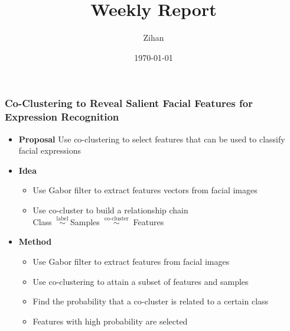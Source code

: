 \documentclass[11pt]{beamer}
\title{Weekly Report}
\author{Zihan}
\date{\today}
\begin{document}


\begin{frame}
    \frametitle{Co-Clustering to Reveal Salient Facial Features for Expression Recognition}
    \begin{itemize}
        \item \textbf{Proposal} Use co-clustering to select features that can be used to classify facial expressions
        \item \textbf{Idea}
              \begin{itemize}
                  \item Use Gabor filter to extract features vectors from facial images
                  \item Use co-cluster to build a relationship chain \\
                        Class $\stackrel{\text { label }}{\sim }$Samples $\stackrel{\text { co-cluster }}{\sim }$ Features
              \end{itemize}
        \item \textbf{Method}
              \begin{itemize}
                  \item Use Gabor filter to extract features from facial images
                  \item Use co-clustering to attain a subset of features and samples
                  \item Find the probability that a co-cluster is related to a certain class
                  \item Features with high probability are selected
              \end{itemize}
    \end{itemize}
\end{frame}
\end{document}

